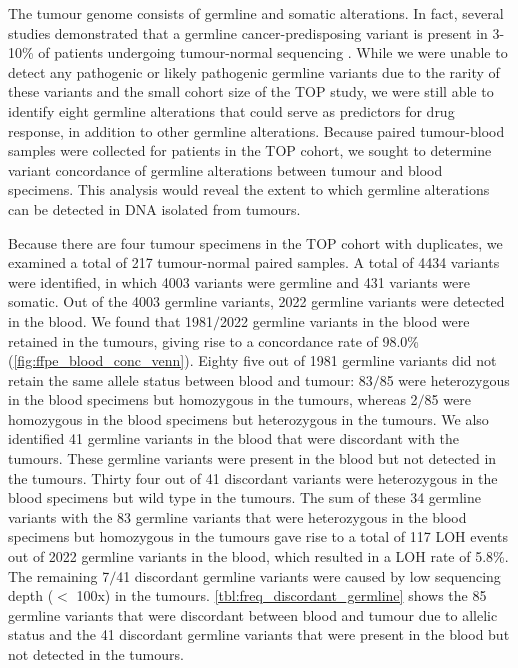 The tumour genome consists of germline and somatic alterations. In fact, several studies demonstrated that a germline cancer-predisposing variant is present in 3-10\% of patients undergoing tumour-normal sequencing \cite{Raymond2016, Meric-Bernstam2016, Schrader2015, Jones2015a}. While we were unable to detect any pathogenic or likely pathogenic germline variants due to the rarity of these variants and the small cohort size of the TOP study, we were still able to identify eight germline alterations that could serve as predictors for drug response, in addition to other germline alterations. Because paired tumour-blood samples were collected for patients in the TOP cohort, we sought to determine variant concordance of germline alterations between tumour and blood specimens. This analysis would reveal the extent to which germline alterations can be detected in DNA isolated from tumours.

Because there are four tumour specimens in the TOP cohort with duplicates, we examined a total of 217 tumour-normal paired samples. A total of 4434 variants were identified, in which 4003 variants were germline and 431 variants were somatic. Out of the 4003 germline variants, 2022 germline variants were detected in the blood. We found that 1981$/$2022 germline variants in the blood were retained in the tumours, giving rise to a concordance rate of 98.0\% (\autoref{fig:ffpe_blood_conc_venn}). Eighty five out of 1981 germline variants did not retain the same allele status between blood and tumour: 83$/$85 were heterozygous in the blood specimens but homozygous in the tumours, whereas 2$/$85 were homozygous in the blood specimens but heterozygous in the tumours. We also identified 41 germline variants in the blood that were discordant with the tumours. These germline variants were present in the blood but not detected in the tumours. Thirty four out of 41 discordant variants were heterozygous in the blood specimens but wild type in the tumours. The sum of these 34 germline variants with the 83 germline variants that were heterozygous in the blood specimens but homozygous in the tumours gave rise to a total of 117 LOH events out of 2022 germline variants in the blood, which resulted in a LOH rate of 5.8\%. The remaining 7$/$41 discordant germline variants were caused by low sequencing depth ($<$ 100x) in the tumours. \autoref{tbl:freq_discordant_germline} shows the 85 germline variants that were discordant between blood and tumour due to allelic status and the 41 discordant germline variants that were present in the blood but not detected in the tumours.

